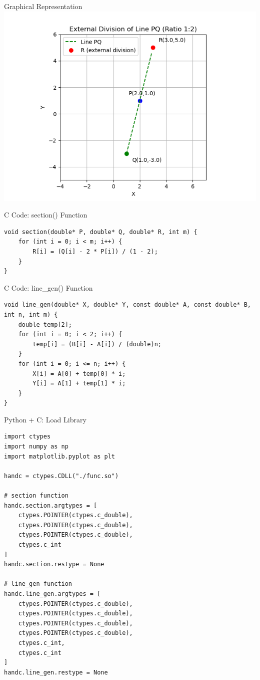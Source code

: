 \documentclass{beamer}
\begin{document}
\begin{frame}{Graphical Representation}
    \centering
    \includegraphics[width=0.8\linewidth]{figs/section_graph.png}
    \captionsetup{justification=centering}
\end{frame}

\begin{frame}[fragile]{C Code: section() Function}
\begin{lstlisting}[style=CStyle]
void section(double* P, double* Q, double* R, int m) {
    for (int i = 0; i < m; i++) {
        R[i] = (Q[i] - 2 * P[i]) / (1 - 2);
    }
}
\end{lstlisting}
\end{frame}

\begin{frame}[fragile]{C Code: line\_gen() Function}
\begin{lstlisting}[style=CStyle]
void line_gen(double* X, double* Y, const double* A, const double* B, int n, int m) {
    double temp[2];
    for (int i = 0; i < 2; i++) {
        temp[i] = (B[i] - A[i]) / (double)n;
    }
    for (int i = 0; i <= n; i++) {
        X[i] = A[0] + temp[0] * i;
        Y[i] = A[1] + temp[1] * i;
    }
}
\end{lstlisting}
\end{frame}

\begin{frame}[fragile]{Python + C: Load Library}
\begin{lstlisting}[style=PyStyle]
import ctypes
import numpy as np
import matplotlib.pyplot as plt

handc = ctypes.CDLL("./func.so")

# section function
handc.section.argtypes = [
    ctypes.POINTER(ctypes.c_double),
    ctypes.POINTER(ctypes.c_double),
    ctypes.POINTER(ctypes.c_double),
    ctypes.c_int
]
handc.section.restype = None

# line_gen function
handc.line_gen.argtypes = [
    ctypes.POINTER(ctypes.c_double),
    ctypes.POINTER(ctypes.c_double),
    ctypes.POINTER(ctypes.c_double),
    ctypes.POINTER(ctypes.c_double),
    ctypes.c_int,
    ctypes.c_int
]
handc.line_gen.restype = None
\end{lstlisting}
\end{frame}
\end{document}
